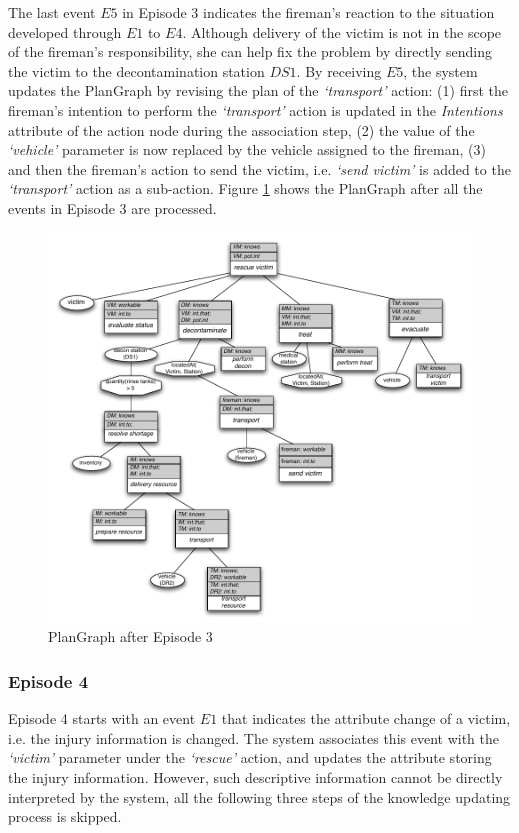 The last event $E5$ in Episode 3 indicates the fireman's reaction to the situation developed through $E1$ to $E4$. Although delivery of the victim is not in the scope of the fireman's responsibility, she can help fix the problem by directly sending the victim to the decontamination station $DS1$. By receiving $E5$, the system updates the PlanGraph by revising the plan of the \emph{`transport'} action: (1) first the fireman's intention to perform the \emph{`transport'} action is updated in the \emph{Intentions} attribute of the action node during the association step, (2) the value of the \emph{`vehicle'} parameter is now replaced by the vehicle assigned to the fireman, (3) and then the fireman's action to send the victim, i.e. \emph{`send victim'} is added to the \emph{`transport'} action as a sub-action. Figure \ref{fig:plangraph_ep3} shows the PlanGraph after all the events in Episode 3 are processed.

\begin{figure}[htbp] %
	\centering
	\includegraphics[width=5.8in]{plangraph_ep3.pdf} 
	\caption{PlanGraph after Episode 3}
	\label{fig:plangraph_ep3}
\end{figure}

\subsubsection{Episode 4} %
\label{ssub:episode_4}
Episode 4 starts with an event $E1$ that indicates the attribute change of a victim, i.e. the injury information is changed. The system associates this event with the \emph{`victim'} parameter under the \emph{`rescue'} action, and updates the attribute storing the injury information. However, such descriptive information cannot be directly interpreted by the system, all the following three steps of the knowledge updating process is skipped. 

